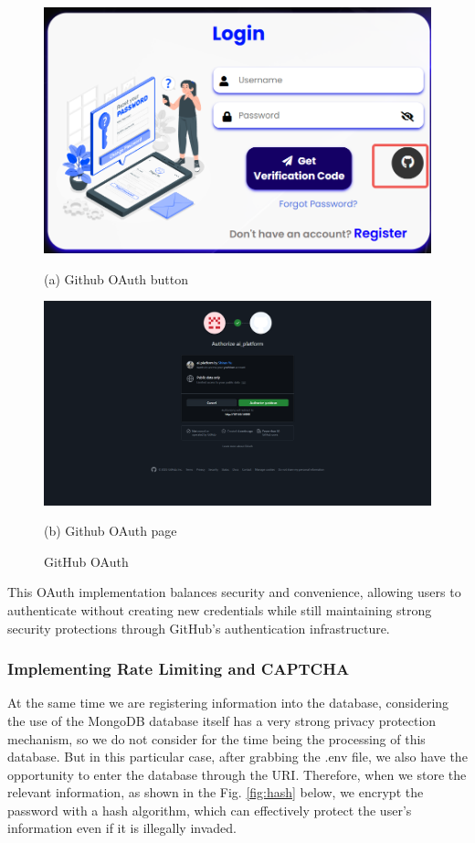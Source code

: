 \documentclass{article}
\begin{document}
\begin{figure}[htb]
    \begin{minipage}{0.5\textwidth}
        \centering
        \includegraphics[width=\textwidth]{images/github_oauth_button.png}
        \caption*{(a) Github OAuth button}
    \end{minipage}
    \hfill
    \begin{minipage}{0.5\textwidth}
        \centering
        \includegraphics[width=\textwidth]{images/github_oauth_page.png}
        \caption*{(b) Github OAuth page}
    \end{minipage}
    \caption{GitHub OAuth}
    \label{fig:github_oauth}
\end{figure}

This OAuth implementation balances security and convenience, allowing users to authenticate without creating new credentials while still maintaining strong security protections through GitHub's authentication infrastructure.

\subsubsection{Implementing Rate Limiting and CAPTCHA}
At the same time we are registering information into the database, considering the use of the MongoDB database itself has a very strong privacy protection mechanism, so we do not consider for the time being the processing of this database. 
But in this particular case, after grabbing the .env file, we also have the opportunity to enter the database through the URI. 
Therefore, when we store the relevant information, as shown in the Fig. \ref{fig:hash} below, we encrypt the password with a hash algorithm, which can effectively protect the user's information even if it is illegally invaded.
\end{document}
